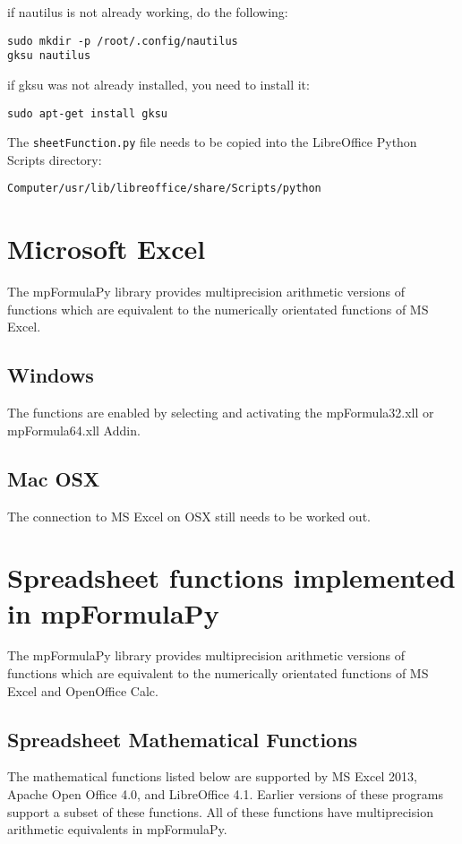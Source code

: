 if nautilus is not already working, do the following:
\begin{verbatim}
sudo mkdir -p /root/.config/nautilus
gksu nautilus
\end{verbatim}

if gksu was not already installed, you need to install it:
\begin{verbatim}
sudo apt-get install gksu
\end{verbatim}

The \verb|sheetFunction.py| file needs to be copied into the LibreOffice Python Scripts directory:
\begin{verbatim}
Computer/usr/lib/libreoffice/share/Scripts/python
\end{verbatim}



\newpage
\section{Microsoft Excel}
The mpFormulaPy library provides multiprecision arithmetic versions of  functions which are equivalent to the numerically orientated functions of MS Excel.


\subsection{Windows}
The functions are enabled by selecting and activating the mpFormula32.xll or mpFormula64.xll Addin.


\subsection{Mac OSX}
The connection to MS Excel on OSX still needs to be worked out.




\newpage
\section{Spreadsheet functions implemented in mpFormulaPy}
\label{Using Spreadsheet functions}
The mpFormulaPy library provides multiprecision arithmetic versions of  functions which are equivalent to the numerically orientated functions of MS Excel and OpenOffice Calc.


\subsection{Spreadsheet Mathematical Functions}
The mathematical functions listed below are supported by MS Excel 2013, Apache Open Office 4.0, and LibreOffice 4.1. Earlier versions of these programs support a subset of these functions.
All of these functions have multiprecision arithmetic equivalents in mpFormulaPy.

